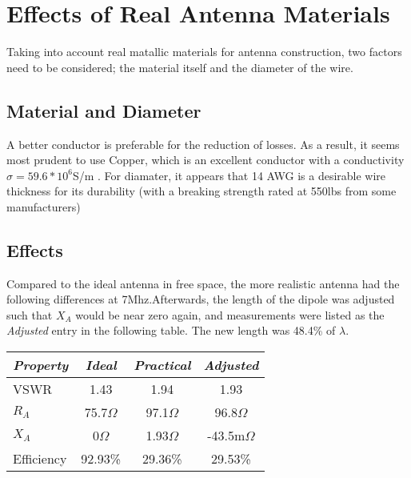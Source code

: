 \section{Effects of Real Antenna Materials}

Taking into account real matallic materials for antenna construction, two
factors need to be considered; the material itself and the diameter of the
wire.
\subsection{Material and Diameter}
A better conductor is preferable for the reduction of losses. As a result, it
seems most prudent to use Copper, which is an excellent conductor with a
conductivity $\sigma=59.6*10^6$S/m \cite{copper}.
For diamater, it appears that 14 AWG is a desirable wire thickness for its durability (with a
breaking strength rated at 550lbs from some manufacturers)\cite{wireman}
\subsection{Effects}

Compared to the ideal antenna in free space, the more realistic antenna had the
following differences at 7Mhz.Afterwards, the length of the dipole was adjusted
such that $X_A$ would be near zero again, and measurements were listed as the \emph{
Adjusted} entry in the following table. The new length was 48.4\% of $\lambda$.
\begin{center}
\begin{tabular}{|l||c|c|c|}
  \hline
  \emph{Property}&\emph{Ideal}&\emph{Practical}&\emph{Adjusted}\\
  \hline
  VSWR        & 1.43              &   1.94          & 1.93\\
  $R_A$       & 75.7$\Omega$      &   97.1$\Omega$  & 96.8$\Omega$\\
  $X_A$       & 0$\Omega$         &   1.93$\Omega$  & -43.5m$\Omega$\\
  Efficiency  & 92.93\%           &  29.36\%        & 29.53\%\\
  \hline
\end{tabular}
\end{center}
